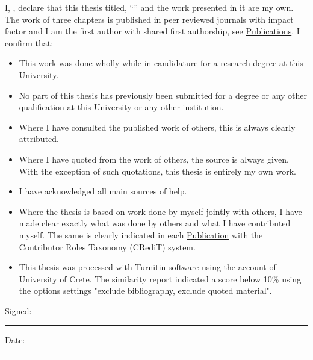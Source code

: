 \documentclass[
11pt, %
english, %
singlespacing, %
liststotoc, %
toctotoc, %
headsepline, %
]{MastersDoctoralThesis} %
\begin{document}

\begin{declaration}
\addchaptertocentry{\authorshipname} %
\noindent I, \authorname, declare that this thesis titled, \enquote{\ttitle} and the work presented in it are my own. The work of three chapters is 
published in peer reviewed journals with impact factor and I am the first author with shared first authorship, see \hyperref[app:publications]{Publications}. I confirm that:

\begin{itemize} 
    \item This work was done wholly while in candidature for a research degree at this University.
    \item No part of this thesis has previously been submitted for a degree or any other qualification at this University or any other institution.
    \item Where I have consulted the published work of others, this is always clearly attributed.
    \item Where I have quoted from the work of others, the source is always given. With the exception of such quotations, this thesis is entirely my own work.
    \item I have acknowledged all main sources of help.
    \item Where the thesis is based on work done by myself jointly with others, I have made clear exactly what was done by others and what I have contributed myself. The same is clearly indicated in each \hyperref[app:publications]{Publication} with the Contributor Roles Taxonomy (CRediT) system.
    \item This thesis was processed with Turnitin software using the account of University of Crete. The similarity report indicated a score below 10\% using the options settings "exclude bibliography, exclude quoted material".
\end{itemize}
% 
\noindent Signed:\\
\rule[0.5em]{25em}{0.5pt} %
 
\noindent Date:\\
\rule[0.5em]{25em}{0.5pt} %
\end{declaration}
%
\end{document}
